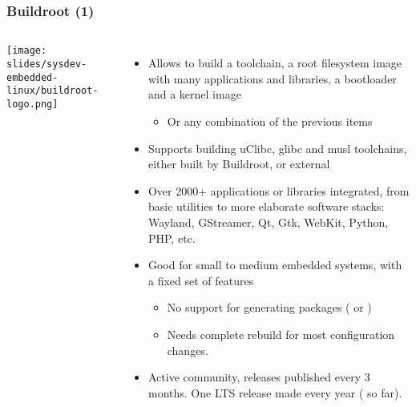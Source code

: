 \begin{frame}
  \frametitle{Buildroot (1)}
  \begin{columns}
    \texttt{[image: slides/sysdev-embedded-linux/buildroot-logo.png]}
       \begin{itemize}
       \item Allows to build a toolchain, a root filesystem image with many
         applications and libraries, a bootloader and a kernel image
         \begin{itemize}
         \item Or any combination of the previous items
         \end{itemize}
       \item Supports building uClibc, glibc and musl toolchains,
         either built by Buildroot, or external
       \item Over 2000+ applications or libraries integrated, from basic
         utilities to more elaborate software stacks: Wayland, GStreamer, Qt,
         Gtk, WebKit, Python, PHP, etc.
       \item Good for small to medium embedded systems, with a fixed set of
         features
         \begin{itemize}
         \item No support for generating packages ( or
           )
         \item Needs complete rebuild for most configuration changes.
         \end{itemize}
       \item Active community, releases published every 3 months. One LTS
             release made every year ( so far).
       \end{itemize}
  \end{columns}
\end{frame}

